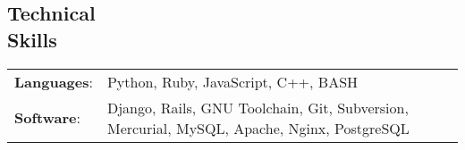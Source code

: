 \documentclass[margin]{res}
\begin{document}
\begin{resume}
    \section{Technical \\ Skills}
      \begin{tabular}{l p{3.6in}}
        \textbf{Languages}:                   & Python, Ruby, JavaScript, C++, BASH \\ [1pt]
        \textbf{Software}:                    & Django, Rails, GNU Toolchain, Git, Subversion, Mercurial, MySQL, Apache, Nginx, PostgreSQL \\ [1pt]
      \end{tabular}

  \end{resume}
\end{document}
